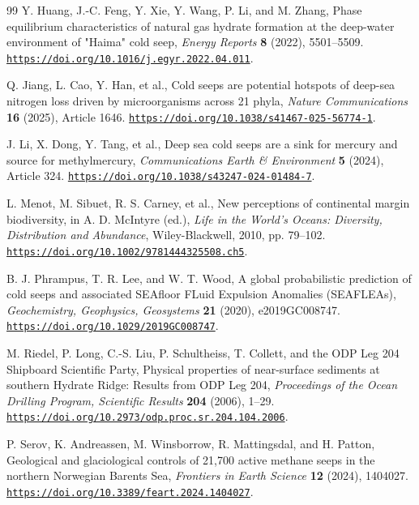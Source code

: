 \documentclass[11pt,letterpaper]{article}
\begin{document}
\begin{thebibliography}{99}
Y. Huang, J.-C. Feng, Y. Xie, Y. Wang, P. Li, and M. Zhang,
Phase equilibrium characteristics of natural gas hydrate formation at the deep-water
environment of "Haima" cold seep,
\emph{Energy Reports} \textbf{8} (2022), 5501--5509.
\href{https://doi.org/10.1016/j.egyr.2022.04.011}
{\nolinkurl{https://doi.org/10.1016/j.egyr.2022.04.011}}.

Q. Jiang, L. Cao, Y. Han, et al.,
Cold seeps are potential hotspots of deep-sea nitrogen loss driven by microorganisms across 21 phyla,
\emph{Nature Communications} \textbf{16} (2025), Article 1646.
\href{https://doi.org/10.1038/s41467-025-56774-1}
{\nolinkurl{https://doi.org/10.1038/s41467-025-56774-1}}.

J. Li, X. Dong, Y. Tang, et al.,
Deep sea cold seeps are a sink for mercury and source for methylmercury,
\emph{Communications Earth \& Environment} \textbf{5} (2024), Article 324.
\href{https://doi.org/10.1038/s43247-024-01484-7}
{\nolinkurl{https://doi.org/10.1038/s43247-024-01484-7}}.

L. Menot, M. Sibuet, R. S. Carney, et al.,
New perceptions of continental margin biodiversity,
in A. D. McIntyre (ed.), \emph{Life in the World's Oceans: Diversity,
Distribution and Abundance}, Wiley-Blackwell, 2010, pp. 79--102.
\href{https://doi.org/10.1002/9781444325508.ch5}
{\nolinkurl{https://doi.org/10.1002/9781444325508.ch5}}.

B. J. Phrampus, T. R. Lee, and W. T. Wood,
A global probabilistic prediction of cold seeps and associated SEAfloor FLuid
Expulsion Anomalies (SEAFLEAs),
\emph{Geochemistry, Geophysics, Geosystems} \textbf{21} (2020), e2019GC008747.
\href{https://doi.org/10.1029/2019GC008747}
{\nolinkurl{https://doi.org/10.1029/2019GC008747}}.

M. Riedel, P. Long, C.-S. Liu, P. Schultheiss, T. Collett, and the ODP Leg 204
Shipboard Scientific Party,
Physical properties of near-surface sediments at southern Hydrate Ridge:
Results from ODP Leg 204,
\emph{Proceedings of the Ocean Drilling Program, Scientific Results} \textbf{204}
(2006), 1--29.
\href{https://doi.org/10.2973/odp.proc.sr.204.104.2006}
{\nolinkurl{https://doi.org/10.2973/odp.proc.sr.204.104.2006}}.

P. Serov, K. Andreassen, M. Winsborrow, R. Mattingsdal, and H. Patton,
Geological and glaciological controls of 21,700 active methane seeps in the
northern Norwegian Barents Sea,
\emph{Frontiers in Earth Science} \textbf{12} (2024), 1404027.
\href{https://doi.org/10.3389/feart.2024.1404027}
{\nolinkurl{https://doi.org/10.3389/feart.2024.1404027}}.


\end{thebibliography}
\end{document}
